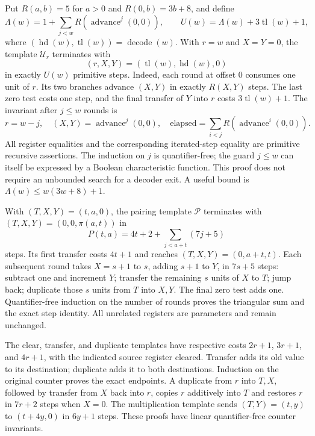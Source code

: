 Put $R(a,b)=5$ for $a>0$ and $R(0,b)=3b+8$, and define
\[
 \Lambda(w)=1+\sum_{j<w}R(\operatorname{advance}^{j}(0,0)),\qquad
 U(w)=\Lambda(w)+3\operatorname{tl}(w)+1,
\]
where $(\operatorname{hd}(w),\operatorname{tl}(w))=
\operatorname{decode}(w)$.  With $r=w$ and $X=Y=0$, the template
$\mathcal U_r$ terminates with
\[
 (r,X,Y)=(\operatorname{tl}(w),\operatorname{hd}(w),0)
\]
in exactly $U(w)$ primitive steps.  Indeed, each round at offset 0
consumes one unit of $r$.  Its two branches advance $(X,Y)$ in exactly
$R(X,Y)$ steps.  The last zero test costs one step, and the final transfer
of $Y$ into $r$ costs $3\operatorname{tl}(w)+1$.
The invariant after $j\le w$ rounds is
\[
 r=w-j,\quad(X,Y)=\operatorname{advance}^{j}(0,0),
 \quad\text{elapsed}=\sum_{i<j}R(\operatorname{advance}^{i}(0,0)).
\]
All register equalities and the corresponding iterated-step equality are
primitive recursive assertions.  The induction on $j$ is quantifier-free;
the guard $j\le w$ can itself be expressed by a Boolean characteristic
function.  This proof does not require an unbounded search for a decoder
exit.  A useful bound is $\Lambda(w)\le w(3w+8)+1$.

With $(T,X,Y)=(t,a,0)$, the pairing template $\mathcal P$ terminates
with $(T,X,Y)=(0,0,\pi(a,t))$ in
\[
 P(t,a)=4t+2+\sum_{j<a+t}(7j+5)                       \tag{P}
\]
steps.  Its first transfer costs $4t+1$ and reaches
$(T,X,Y)=(0,a+t,t)$.  Each subsequent round takes $X=s+1$ to $s$,
adding $s+1$ to $Y$, in $7s+5$ steps: subtract one and increment $Y$;
transfer the remaining $s$ units of $X$ to $T$; jump back; duplicate
those $s$ units from $T$ into $X,Y$.  The final zero test adds one.
Quantifier-free induction on the number of rounds proves the triangular
sum and the exact step identity.  All unrelated registers are parameters
and remain unchanged.

The clear, transfer, and duplicate templates have respective costs
$2r+1$, $3r+1$, and $4r+1$, with the indicated source register cleared.
Transfer adds its old value to its destination; duplicate adds it to
both destinations.  Induction on the original counter proves the exact
endpoints.  A duplicate from $r$ into $T,X$, followed by transfer from
$X$ back into $r$, copies $r$ additively into $T$ and restores $r$ in
$7r+2$ steps when $X=0$.  The multiplication template sends
$(T,Y)=(t,y)$ to $(t+4y,0)$ in $6y+1$ steps.  These proofs have linear
quantifier-free counter invariants.

